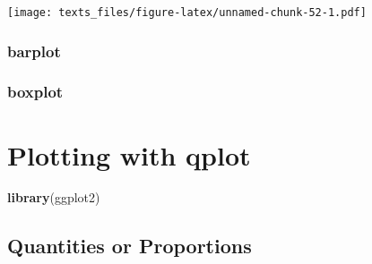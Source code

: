 \documentclass[]{book}
\newenvironment{Shaded}{\begin{snugshade}}{\end{snugshade}}
\newcommand{\DataTypeTok}[1]{\textcolor[rgb]{0.13,0.29,0.53}{#1}}
\newcommand{\DecValTok}[1]{\textcolor[rgb]{0.00,0.00,0.81}{#1}}
\newcommand{\KeywordTok}[1]{\textcolor[rgb]{0.13,0.29,0.53}{\textbf{#1}}}
\newcommand{\NormalTok}[1]{#1}
\newcommand{\OperatorTok}[1]{\textcolor[rgb]{0.81,0.36,0.00}{\textbf{#1}}}
\newcommand{\StringTok}[1]{\textcolor[rgb]{0.31,0.60,0.02}{#1}}
\begin{document}
\begin{Shaded}
\end{Shaded}

\texttt{[image: texts\_files/figure-latex/unnamed-chunk-52-1.pdf]}

\hypertarget{barplot}{%
\subsection*{\texorpdfstring{\textbf{barplot}}{barplot}}\label{barplot}}

\hypertarget{boxplot}{%
\subsection*{\texorpdfstring{\textbf{boxplot}}{boxplot}}\label{boxplot}}

\hypertarget{plotting-with-qplot}{%
\chapter{\texorpdfstring{Plotting with \textbf{qplot}}{Plotting with qplot}}\label{plotting-with-qplot}}

\begin{Shaded}
\begin{Highlighting}[]
\KeywordTok{library}\NormalTok{(ggplot2)}
\end{Highlighting}
\end{Shaded}

\hypertarget{plotquantities}{%
\section*{Quantities or Proportions}\label{plotquantities}}

\begin{Shaded}
\end{Shaded}
\end{document}
